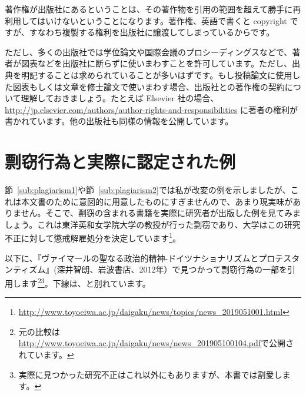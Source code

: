 著作権が出版社にあるということは、その著作物を引用の範囲を超えて勝手に再利用してはいけないということになります。著作権、英語で書くと copyright ですが、すなわち複製する権利を出版社に譲渡してしまっているからです。

ただし、多くの出版社では学位論文や国際会議のプロシーディングスなどで、著者が図表などを出版社に断らずに使いまわすことを許可しています。ただし、出典を明記することは求められていることが多いはずです。もし投稿論文に使用した図表もしくは文章を修士論文で使いまわす場合、出版社との著作権の契約について理解しておきましょう。たとえば Elsevier 社の場合、\url{http://jp.elsevier.com/authors/author-rights-and-responsibilities} に著者の権利が書かれています。他の出版社も同様の情報を公開しています。

\section{剽窃行為と実際に認定された例}

節~\ref{sub:plagiarism1}や節~\ref{sub:plagiarism2}では私が改変の例を示しましたが、これは本文書のために意図的に用意したものにすぎませんので、あまり現実味がありません。そこで、剽窃の含まれる書籍を実際に研究者が出版した例を見てみましょう。これは東洋英和女学院大学の教授が行った剽窃であり、大学はこの研究不正に対して懲戒解雇処分を決定しています\footnote{\url{http://www.toyoeiwa.ac.jp/daigaku/news/topics/news_2019051001.html}}。

以下に、『ヴァイマールの聖なる政治的精神-ドイツナショナリズムとプロテスタンティズム』(深井智朗、岩波書店、2012年）で見つかって剽窃行為の一部を引用します\footnote{元の比較は\url{http://www.toyoeiwa.ac.jp/daigaku/news/news_201905100104.pdf}で公開されています。}\footnote{実際に見つかった研究不正はこれ以外にもありますが、本書では割愛します。}。下線は、と別れています。

